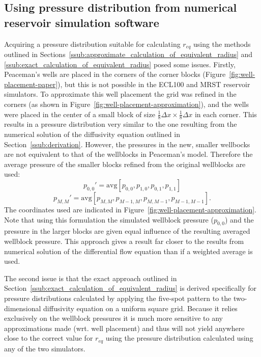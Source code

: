 \subsection{Using pressure distribution from numerical reservoir simulation software} %
\label{sub:using_pressure_distribution_from_numerical_reservoir_simulation_software}
Acquiring a pressure distribution suitable for calculating $r_{eq}$ using the methods outlined in Sections~\ref{ssub:approximate_calculation_of_equivalent_radius} and \ref{ssub:exact_calculation_of_equivalent_radius} posed some issues. Firstly, Peaceman's wells are placed in the corners of the corner blocks (Figure~\ref{fig:well-placement-paper}), but this is not possible in the ECL100 and MRST reservoir simulators. To approximate this well placement the grid was refined in the corners (as shown in Figure~\ref{fig:well-placement-approximation}), and the wells were placed in the center of a small block of size $\frac{1}{8}\Delta x\times \frac{1}{8}\Delta x$ in each corner. This results in a pressure distribution very similar to the one resulting from the numerical solution of the diffusivity equation outlined in Section~\ref{ssub:derivation}. However, the pressures in the new, smaller wellbocks are not equivalent to that of the wellblocks in Peaceman's model. Therefore the average pressure of the smaller blocks refined from the original wellblocks are used:
\begin{equation}
    p_{0,0}' = \mathrm{avg}\left[ p_{0,0}, p_{1,0}, p_{0,1}, p_{1,1} \right]
\end{equation}
\begin{equation}
    p_{M,M}' = \mathrm{avg}\left[ p_{M,M}, p_{M-1,M}, p_{M,M-1}, p_{M-1,M-1} \right].
\end{equation}
The coordinates used are indicated in Figure~\ref{fig:well-placement-approximation}. Note that using this formulation the simulated wellblock pressure ($p_{0,0}$) and the pressure in the larger blocks are given equal influence of the resulting averaged wellblock pressure. This approach gives a result far closer to the results from numerical solution of the differential flow equation than if a weighted average is used.

The second issue is that the exact approach outlined in Section~\ref{ssub:exact_calculation_of_equivalent_radius} is derived specifically for pressure distributions calculated by applying the five-spot pattern to the two-dimensional diffusivity equation on a uniform square grid. Because it relies exclusively on the wellblock pressures it is much more sensitive to any approximations made (wrt. well placement) and thus will not yield anywhere close to the correct value for $r_{eq}$ using the pressure distribution calculated using any of the two simulators.

